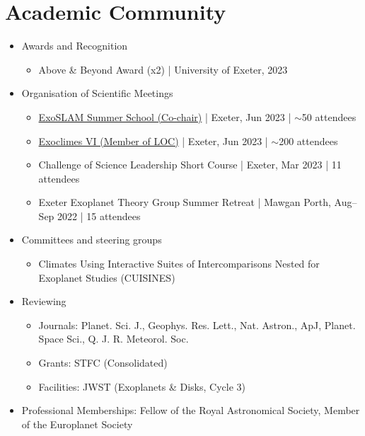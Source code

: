 \documentclass[a4paper, 11pt]{article}
\begin{document}
\section{Academic Community}
\begin{itemize}[nosep, leftmargin=10pt]
    \item Awards and Recognition
    \begin{itemize}
        \item Above \& Beyond Award (x2) | University of Exeter, 2023
    \end{itemize}
    \item Organisation of Scientific Meetings
    \begin{itemize}
        \item \href{https://exoclimes.org/exoslam/index.html}{ExoSLAM Summer School (Co-chair)} | Exeter, Jun 2023 | $\sim$50 attendees
        \item \href{https://exoclimes.org}{Exoclimes VI (Member of LOC)} | Exeter, Jun 2023 | $\sim$200 attendees
        \item Challenge of Science Leadership Short Course | Exeter, Mar 2023 | 11 attendees
        \item Exeter Exoplanet Theory Group Summer Retreat | Mawgan Porth, Aug--Sep 2022 | 15 attendees
    \end{itemize}
    \item Committees and steering groups
    \begin{itemize}
        \item Climates Using Interactive Suites of Intercomparisons Nested for Exoplanet Studies (CUISINES)
    \end{itemize}
    \item Reviewing
    \begin{itemize}
        \item Journals: Planet. Sci. J., Geophys. Res. Lett., Nat. Astron., ApJ, Planet. Space Sci., Q. J. R. Meteorol. Soc.
        \item Grants: STFC (Consolidated)
        \item Facilities: JWST (Exoplanets \& Disks, Cycle 3)
    \end{itemize}
    \item Professional Memberships: Fellow of the Royal Astronomical Society, Member of the Europlanet Society
\end{itemize}

\end{document}
